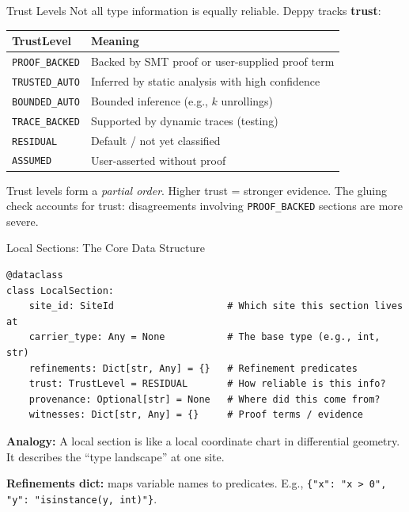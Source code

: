 \documentclass[aspectratio=169,10pt]{beamer}
\begin{document}
\begin{frame}{Trust Levels}
Not all type information is equally reliable. Deppy tracks \textbf{trust}:

\vspace{0.3em}
\renewcommand{\arraystretch}{1.3}
\begin{tabular}{@{}lp{7cm}@{}}
\toprule
\textbf{TrustLevel} & \textbf{Meaning} \\
\midrule
\texttt{PROOF\_BACKED} & Backed by SMT proof or user-supplied proof term \\
\texttt{TRUSTED\_AUTO} & Inferred by static analysis with high confidence \\
\texttt{BOUNDED\_AUTO} & Bounded inference (e.g., $k$ unrollings) \\
\texttt{TRACE\_BACKED} & Supported by dynamic traces (testing) \\
\texttt{RESIDUAL} & Default / not yet classified \\
\texttt{ASSUMED} & User-asserted without proof \\
\bottomrule
\end{tabular}

\vspace{0.3em}
Trust levels form a \emph{partial order}. Higher trust = stronger evidence. The gluing check accounts for trust: disagreements involving \texttt{PROOF\_BACKED} sections are more severe.
\end{frame}

\begin{frame}[fragile]{Local Sections: The Core Data Structure}
\begin{lstlisting}
@dataclass
class LocalSection:
    site_id: SiteId                    # Which site this section lives at
    carrier_type: Any = None           # The base type (e.g., int, str)
    refinements: Dict[str, Any] = {}   # Refinement predicates
    trust: TrustLevel = RESIDUAL       # How reliable is this info?
    provenance: Optional[str] = None   # Where did this come from?
    witnesses: Dict[str, Any] = {}     # Proof terms / evidence
\end{lstlisting}

\vspace{0.3em}
\textbf{Analogy:} A local section is like a local coordinate chart in differential geometry. It describes the ``type landscape'' at one site.

\vspace{0.3em}
\textbf{Refinements dict:} maps variable names to predicates.
E.g., \texttt{\{"x": "x > 0", "y": "isinstance(y, int)"\}}.
\end{frame}
\end{document}
